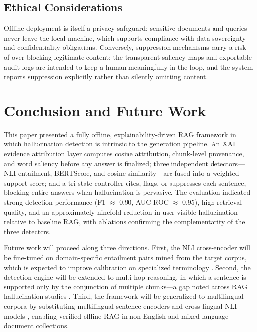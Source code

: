 \documentclass[journal]{IEEEtran}
\begin{document}
\subsection{Ethical Considerations}
Offline deployment is itself a privacy safeguard: sensitive documents and
queries never leave the local machine, which supports compliance with
data-sovereignty and confidentiality obligations. Conversely, suppression
mechanisms carry a risk of over-blocking legitimate content; the transparent
saliency maps and exportable audit logs are intended to keep a human
meaningfully in the loop, and the system reports suppression explicitly
rather than silently omitting content.

\section{Conclusion and Future Work}
This paper presented a fully offline, explainability-driven RAG framework in
which hallucination detection is intrinsic to the generation pipeline. An
XAI evidence attribution layer computes cosine attribution, chunk-level
provenance, and word saliency before any answer is finalized; three
independent detectors---NLI entailment, BERTScore, and cosine
similarity---are fused into a weighted support score; and a tri-state
controller cites, flags, or suppresses each sentence, blocking entire
answers when hallucination is pervasive. The evaluation indicated strong
detection performance (F1 $\approx$ 0.90, AUC-ROC $\approx$ 0.95), high
retrieval quality, and an approximately ninefold reduction in user-visible
hallucination relative to baseline RAG, with ablations confirming the
complementarity of the three detectors.

Future work will proceed along three directions. First, the NLI
cross-encoder will be fine-tuned on domain-specific entailment pairs mined
from the target corpus, which is expected to improve calibration on
specialized terminology \cite{krainovskikh2026domain}. Second, the detection
engine will be extended to multi-hop reasoning, in which a sentence is
supported only by the conjunction of multiple chunks---a gap noted across
RAG hallucination studies \cite{liu2024hallucinationqa,yan2024crag}. Third,
the framework will be generalized to multilingual corpora by substituting
multilingual sentence encoders and cross-lingual NLI models
\cite{shwartz2024crosslingual}, enabling verified offline RAG in non-English
and mixed-language document collections.



\end{document}
